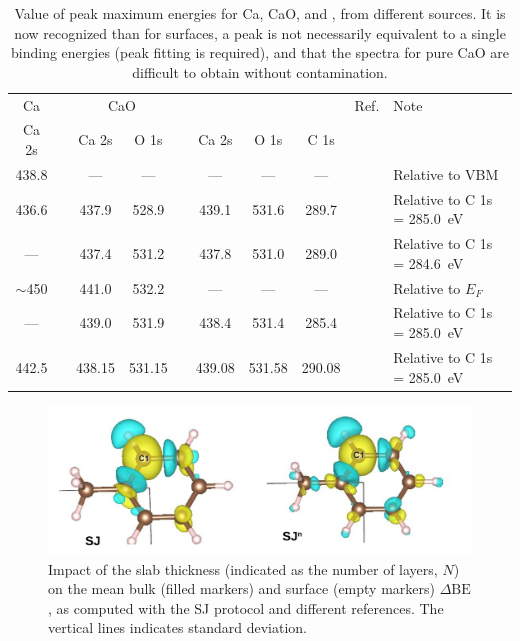 \documentclass[journal=jpccck,manuscript=article]{achemso}
\def\dbe{\ensuremath{\Delta\text{BE}}}
\begin{document}
\begin{table}[!h]
	\begin{tabular}{c ccc c ccc cl}
		\toprule
		Ca & & \multicolumn{2}{c}{CaO} & & \multicolumn{3}{c}{\ce{CaCO3}} & Ref. & Note\\
		\cline{1-1} \cline{3-4} \cline{6-8}
		Ca 2s & & Ca 2s & O 1s  & & Ca 2s & O 1s & C 1s\\
		\midrule
		438.8 & &---&---&& --- & --- &--- & \citenum{fuggleCorelevelBindingEnergies1980} & Relative to VBM\\
		436.6 & & 437.9 & 528.9& & 439.1 &531.6 & 289.7& \citenum{sosulnikovXrayPhotoelectronStudies1992}& Relative to C 1s = \SI{285.0}{\electronvolt}\\
		 --- && 437.4 & 531.2&& 437.8 & 531.0 & 289.0 & \citenum{demriXPSStudyCalcium1995} & Relative to C 1s = \SI{284.6}{\electronvolt}\\
		 $\sim$450 & & 441.0 & 532.2 & & --- & --- & --- & \citenum{ochsCO2ChemisorptionCa1998} & Relative to $E_F$ \\
		 --- & & 439.0 & 531.9 & & 438.4 & 531.4 & 285.4 & \citenum{cristHandbookMonochromaticXPS2000a} & Relative to C 1s = \SI{285.0}{\electronvolt}\\
		 442.5 & & 438.15 & 531.15 & & 439.08 & 531.58 & 290.08 & \citenum{cristXPSLibraryWebsite2021a} & Relative to C 1s = \SI{285.0}{\electronvolt}\\
		\bottomrule
	\end{tabular}
	\caption{Value of peak maximum energies for Ca, CaO, and  , from different sources. It is now recognized than for surfaces, a peak is not necessarily equivalent to a single binding energies (peak fitting is required), and that the spectra for pure CaO are difficult to obtain without contamination.\cite{dupinSystematicXPSStudies2000}}
\end{table}

\begin{figure}[!h]
\centering
\includegraphics[width=\linewidth]{FigureS3}
\caption{Impact of the slab thickness (indicated as the number of layers, $N$) on the mean bulk (filled markers)  and surface (empty markers) \dbe{}, as computed with the SJ protocol and different references. The vertical lines indicates standard deviation.}
\label{fig:slabsthicknessSJ}
\end{figure}
\end{document}
